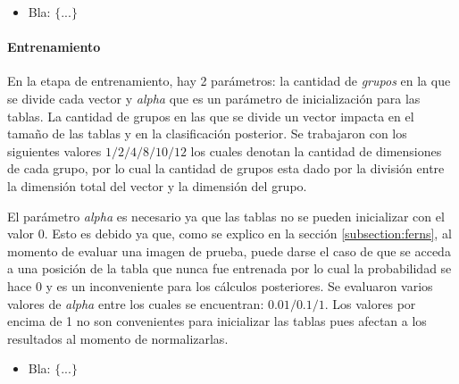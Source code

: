 	\begin{itemize}
		\item Bla: $\{ ... \}$
	\end{itemize}

	\paragraph{Entrenamiento}

	En la etapa de entrenamiento, hay 2 parámetros: la cantidad de \textit{grupos} en la que se divide cada vector y \textit{alpha} que es un parámetro de inicialización para las tablas. La cantidad de grupos en las que se divide un vector impacta en el tamaño de las tablas y en la clasificación posterior. Se trabajaron con los siguientes valores $1/2/4/8/10/12$ los cuales denotan la cantidad de dimensiones de cada grupo, por lo cual  la cantidad de grupos esta dado por la división entre la dimensión total del vector y la dimensión del grupo.

	El parámetro \textit{alpha} es necesario ya que las tablas no se pueden inicializar con el valor $0$. Esto es debido ya que, como se explico en la sección \ref{subsection:ferns}, al momento de evaluar una imagen de prueba, puede darse el caso de que se acceda a una posición de la tabla que nunca fue entrenada por lo cual la probabilidad se hace 0 y es un inconveniente para los cálculos posteriores. Se evaluaron varios valores de \textit{alpha} entre los cuales se encuentran: $0.01/0.1/1$. Los valores por encima de 1 no son convenientes para inicializar las tablas pues afectan a los resultados al momento de normalizarlas.

	\begin{itemize}
		\item Bla: $\{ ... \}$
	\end{itemize}
